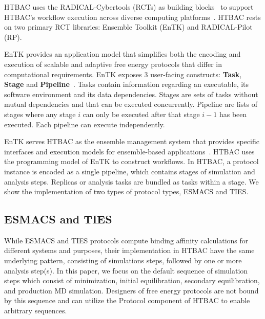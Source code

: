 
HTBAC uses the RADICAL-Cybertools (RCTs) as building
blocks~\cite{review_bb_2016} to support HTBAC's workflow execution across
diverse computing platforms~\cite{turilli2017comprehensive}. HTBAC rests on
two primary RCT libraries: Ensemble Toolkit (EnTK) and RADICAL-Pilot (RP).

EnTK provides an application model that simplifies both the encoding and
execution of scalable and adaptive free energy protocols that differ in
computational requirements. EnTK exposes 3 user-facing constructs:
\textbf{Task}, \textbf{Stage} and \textbf{Pipeline}~\cite{power-of-many17}.
Tasks contain information regarding an executable, its software environment
and its data dependencies. Stages are sets of tasks without mutual
dependencies and that can be executed concurrently. Pipeline are lists of
stages where any stage $i$ can only be executed after that stage $i - 1$ has
been executed. Each pipeline can execute independently.

EnTK serves HTBAC as the ensemble management system that provides specific
interfaces and execution models for ensemble-based
applications~\cite{power-of-many17}. HTBAC uses the programming model of EnTK
to construct workflows. In HTBAC, a protocol instance is encoded as a single
pipeline, which contains stages of simulation and analysis steps. Replicas or
analysis tasks are bundled as tasks within a stage. We show the
implementation of two types of protocol types, ESMACS and TIES.


\subsection{ESMACS and TIES}

While ESMACS and TIES protocols compute binding affinity calculations for
different systems and purposes, their implementation in HTBAC have the same
underlying pattern, consisting of simulations steps, followed by one or more
analysis step(s). In this paper, we focus on the default sequence of
simulation steps which consist of minimization, initial equilibration,
secondary equilibration, and production MD simulation. Designers of free
energy protocols are not bound by this sequence and can utilize the Protocol
component of HTBAC to enable arbitrary sequences. 

